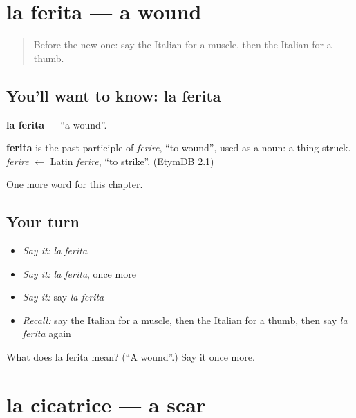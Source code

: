 \section[la ferita]{la ferita — a wound}

\label{lesson:IT-C185-ferita}



\begin{quote}
Before the new one: say the Italian for a muscle, then the Italian for a thumb.
\end{quote}

\subsection*{You'll want to know: la ferita}
\textbf{la ferita} — \textquotedblleft{}a wound\textquotedblright{}.

\begin{cousinweb}
\textbf{ferita} is the past participle of \emph{ferire}, \textquotedblleft{}to wound\textquotedblright{}, used as a noun: a thing struck. \emph{ferire} $\leftarrow$ Latin \emph{ferire}, \textquotedblleft{}to strike\textquotedblright{}. (EtymDB 2.1)
\end{cousinweb}

\begin{grammarlens}[title={What you've built}]
One more word for this chapter.
\end{grammarlens}

\subsection*{Your turn}
\begin{itemize}
\raggedright
  \item \emph{Say it:} \emph{la ferita}
  \item \emph{Say it:} \emph{la ferita}, once more
  \item \emph{Say it:} say \emph{la ferita}
  \item \emph{Recall:} say the Italian for a muscle, then the Italian for a thumb, then say \emph{la ferita} again
\end{itemize}

\begin{tcolorbox}[breakable,colback=teal!4,colframe=teal!35!black,title={Before you move on}]
What does la ferita mean? (\textquotedblleft{}A wound\textquotedblright{}.) Say it once more.
\end{tcolorbox}
\section[la cicatrice]{la cicatrice — a scar}

